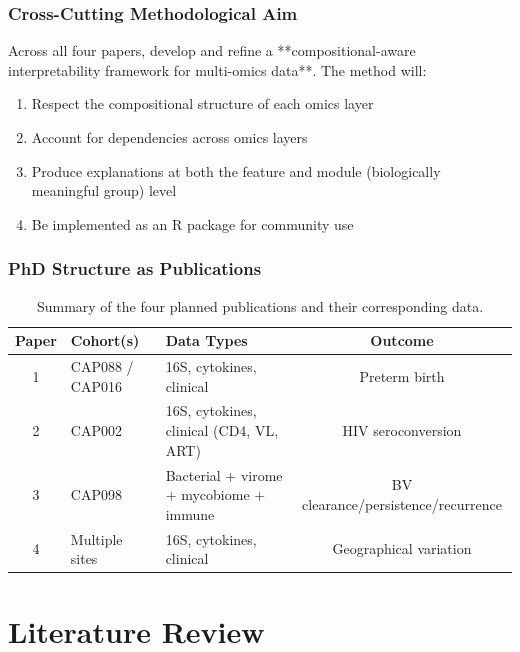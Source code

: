 \documentclass[12pt,a4paper]{report}
\begin{document}
\subsection{Cross-Cutting Methodological Aim}

Across all four papers, develop and refine a **compositional-aware interpretability framework for multi-omics data**. The method will:

\begin{enumerate}
    \item Respect the compositional structure of each omics layer
    \item Account for dependencies across omics layers
    \item Produce explanations at both the feature and module (biologically meaningful group) level
    \item Be implemented as an R package for community use
\end{enumerate}

\subsection{PhD Structure as Publications}

\begin{table}[h]
\centering
\begin{tabular}{cllc}
\toprule
\textbf{Paper} & \textbf{Cohort(s)} & \textbf{Data Types} & \textbf{Outcome} \\
\midrule
1 & CAP088 / CAP016 & 16S, cytokines, clinical & Preterm birth \\
2 & CAP002 & 16S, cytokines, clinical (CD4, VL, ART) & HIV seroconversion \\
3 & CAP098 & Bacterial + virome + mycobiome + immune & BV clearance/persistence/recurrence \\
4 & Multiple sites & 16S, cytokines, clinical & Geographical variation \\
\bottomrule
\end{tabular}
\caption{Summary of the four planned publications and their corresponding data.}
\label{tab:papers}
\end{table}

\chapter{Literature Review}
\end{document}
